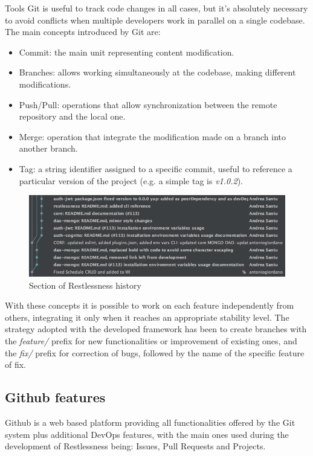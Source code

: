 \begin{chapter}{Tools}
    Git is useful to track code changes in all cases, but it's absolutely necessary
    to avoid conflicts when multiple developers work in parallel on a single codebase.
    The main concepts introduced by Git are:
    \begin{itemize}
        \item Commit: the main unit representing content modification.
        \item Branches: allows working simultaneously at the codebase, making
            different modifications.
        \item Push/Pull: operations that allow synchronization between the remote
            repository and the local one.
        \item Merge: operation that integrate the modification made on a branch
            into another branch.
        \item Tag: a string identifier assigned to a specific commit, useful to
            reference a particular version of the project (e.g. a simple tag is
            \textit{v1.0.2}).
    \end{itemize}

    \begin{figure}
        \centering
        \includegraphics[width=\linewidth]{source/images/rln-git-history.png}
        \caption{Section of Restlessness history}
    \end{figure}

    With these concepts it is possible to work on each feature independently from
    others, integrating it only when it reaches an appropriate stability level.
    The strategy adopted with the developed framework has been to create branches
    with the \textit{feature/} prefix for new functionalities or improvement of
    existing ones, and the \textit{fix/} prefix for correction of bugs, followed
    by the name of the specific feature of fix.

    \subsection{Github features}
    Github is a web based platform providing all functionalities offered by the Git
    system plus additional DevOps features, with the main ones used during the
    development of Restlessness being: Issues, Pull Requests and Projects.


\end{chapter}
